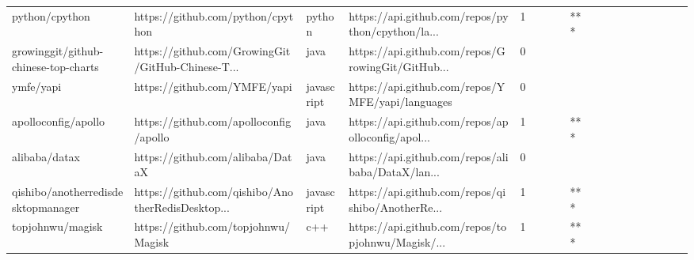 \begin{tabular}{llllrlllllllllllll}
python/cpython                                     &                  https://github.com/python/cpython &            python &  https://api.github.com/repos/python/cpython/la... &       1 &         &        &           &            *** &                 &        &           &           &          &          &       &              &          \\
growinggit/github-chinese-top-charts               &  https://github.com/GrowingGit/GitHub-Chinese-T... &              java &  https://api.github.com/repos/GrowingGit/GitHub... &       0 &         &        &           &                &                 &        &           &           &          &          &       &              &          \\
ymfe/yapi                                          &                       https://github.com/YMFE/yapi &        javascript &   https://api.github.com/repos/YMFE/yapi/languages &       0 &         &        &           &                &                 &        &           &           &          &          &       &              &          \\
apolloconfig/apollo                                &             https://github.com/apolloconfig/apollo &              java &  https://api.github.com/repos/apolloconfig/apol... &       1 &         &        &           &            *** &                 &        &           &           &          &          &       &              &          \\
alibaba/datax                                      &                   https://github.com/alibaba/DataX &              java &  https://api.github.com/repos/alibaba/DataX/lan... &       0 &         &        &           &                &                 &        &           &           &          &          &       &              &          \\
qishibo/anotherredisdesktopmanager                 &  https://github.com/qishibo/AnotherRedisDesktop... &        javascript &  https://api.github.com/repos/qishibo/AnotherRe... &       1 &         &        &           &            *** &                 &        &           &           &          &          &       &              &          \\
topjohnwu/magisk                                   &                https://github.com/topjohnwu/Magisk &               c++ &  https://api.github.com/repos/topjohnwu/Magisk/... &       1 &         &        &           &            *** &                 &        &           &           &          &          &       &              &          \\

\end{tabular}
